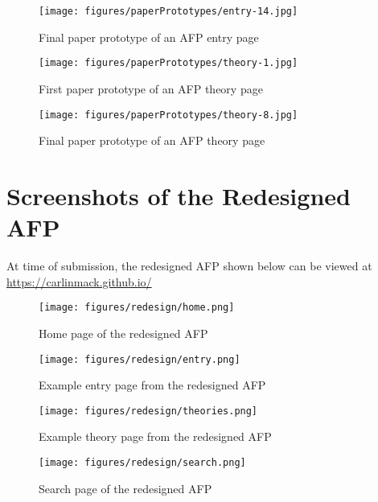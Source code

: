 \documentclass[bsc,frontabs,oneside,singlespacing,parskip,deptreport,logo]{infthesis}
\begin{document}
\begin{figure}[h]
    \centering
    \texttt{[image: figures/paperPrototypes/entry-14.jpg]}
    \caption{Final paper prototype of an AFP entry page}

\end{figure}

\begin{figure}[h]
    \centering
    \texttt{[image: figures/paperPrototypes/theory-1.jpg]}
    \caption{First paper prototype of an AFP theory page}

\end{figure}

\begin{figure}[h]
    \centering
    \texttt{[image: figures/paperPrototypes/theory-8.jpg]}
    \caption{Final paper prototype of an AFP theory page}

\end{figure}

\chapter{Screenshots of the Redesigned AFP}

At time of submission, the redesigned AFP shown below can be viewed at \url{https://carlinmack.github.io/}

\begin{figure}[h]
    \centering
    \texttt{[image: figures/redesign/home.png]}
    \caption{Home page of the redesigned AFP}

\end{figure}

\begin{figure}[h]
    \centering
    \texttt{[image: figures/redesign/entry.png]}
    \caption{Example entry page from the redesigned AFP}

\end{figure}

\begin{figure}[h]
    \centering
    \texttt{[image: figures/redesign/theories.png]}
    \caption{Example theory page from the redesigned AFP}

\end{figure}

\begin{figure}[h]
    \centering
    \texttt{[image: figures/redesign/search.png]}
    \caption{Search page of the redesigned AFP}

\end{figure}
\end{document}
